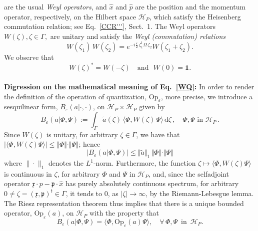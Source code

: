 \documentclass[12pt]{article}
\begin{document}
are the usual \textit{Weyl operators}, and $\hat{x}$ and $\hat{p}$ are the position and the momentum operator, respectively, on the Hilbert space $\mathcal{H}_P$, which satisfy the Heisenberg commutation relation; see Eq.~\eqref{CCR'''}, Sect.~1.
The Weyl operators $W(\zeta), \zeta\in \Gamma,$ are unitary and satisfy the 
\textit{Weyl (commutation) relations}
\begin{equation}\label{WR}
W(\zeta_1)\,W(\zeta_2) = e^{-i\frac{\varepsilon}{2}\,\zeta_{1}^{t} \Omega\,\zeta_2} W(\zeta_1 +\zeta_2).
\end{equation}
We observe that 
\begin{equation}\label{Wstar}
W(\zeta)^{*} = W(-\zeta) \quad \text{and }\,\, W(0)=\mathbf{1}.
\end{equation}
\\
\noindent
{\bf{Digression on the mathematical meaning of Eq.~\eqref{WQ}:}} In order to render the definition of the operation of quantization, $\text{Op}_{\varepsilon}$, 
more precise, we introduce a sesquilinear form, 
$B_{\varepsilon}(a |\cdot, \cdot)$, on $\mathcal{H}_P \times \mathcal{H}_P$ given by
\begin{equation}\label{sesqui}
B_{\varepsilon}(a | \Phi, \Psi):= \int_{\Gamma} \tilde{a}(\zeta) \,\langle \Phi, W(\zeta)\,\Psi \rangle\, \text{d}\zeta\,,
\quad \Phi, \Psi \text{ in } \mathcal{H}_P\,.
\end{equation}
Since $W(\zeta)$ is unitary, for arbitrary $\zeta \in \Gamma$, we have that 
$\vert \langle \Phi, W(\zeta) \Psi \rangle\vert  \leq \Vert \Phi\Vert\cdot \Vert \Psi \Vert$; hence 
\begin{equation}\label{eq:norm_ineq_B(a)}
\vert B_{\varepsilon}(a | \Phi, \Psi) \vert \leq \Vert \tilde{a} \Vert_{1} \, \Vert \Phi \Vert \cdot \Vert \Psi \Vert
\end{equation}
where $\|\cdot\|_1$ denotes the $L^1$-norm.
Furthermore, the function $\zeta \mapsto \langle \Phi, W(\zeta)\Psi \rangle$ is continuous in $\zeta$, for arbitrary $\Phi$ and 
$\Psi$ in $\mathcal{H}_P$, and, since the selfadjoint operator $\mathfrak{x}\cdot \hat{p}-\mathfrak{p}\cdot \hat{x}$
has purely absolutely continuous spectrum, for arbitrary $0\neq \zeta=(\mathfrak{x}, \mathfrak{p})^{t} \in \Gamma$, it tends 
to $0$, as $\vert \zeta \vert \rightarrow \infty$, by the Riemann-Lebesgue lemma. The Riesz representation theorem thus implies that there is a
 unique bounded operator, $\text{Op}_{\varepsilon}(a)$, on $\mathcal{H}_P$ with the property that
\begin{equation}\label{Op}
B_{\varepsilon}(a | \Phi, \Psi)= \langle \Phi, \text{Op}_{\varepsilon}(a)\Psi\rangle, \quad \forall \, \Phi, \Psi \,\text{ in } \,\mathcal{H}_P.
\end{equation}
\end{document}
